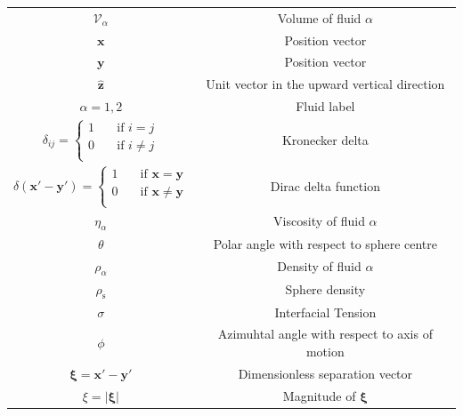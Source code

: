 \documentclass[12pt]{article}
\begin{document}
\begin{longtable}{|c|c|}
    $\mathcal{V}_{\alpha}$                                                          & Volume of fluid $\alpha$ \\
    $\boldsymbol{x}$                                                              & Position vector \\
    $\boldsymbol{y}$                                                              & Position vector \\
    $\boldsymbol{\hat{z}}$                                                        & Unit vector in the upward vertical direction \\
    $\alpha = 1,2$                                                                & Fluid label \\
    $\delta_{ij} = \begin{cases}
    1  & \quad \text{if } i = j\\
    0  & \quad \text{if } i \neq j\\
  \end{cases}$                                                                    & Kronecker delta \\
    $\delta(\boldsymbol{x'} - \boldsymbol{y'}) = \begin{cases}
    1  & \quad \text{if } \boldsymbol{x} = \boldsymbol{y}\\
    0  & \quad \text{if } \boldsymbol{x} \neq \boldsymbol{y}\\
  \end{cases}$                                                                    & Dirac delta function \\
    $\eta_{\alpha}$                                                                 & Viscosity of fluid $\alpha$ \\ 
    $\theta$                                                                      & Polar angle with respect to sphere centre \\
    $\rho_{\alpha}$                                                                 & Density of fluid $\alpha$   \\
    $\rho_{\text{s}}$                                                                & Sphere density          \\
    $\sigma$                                                                      & Interfacial Tension     \\
    $\phi$                                                                        & Azimuhtal angle with respect to axis of motion \\
    $\boldsymbol{\xi} = \boldsymbol{x'} - \boldsymbol{y'}$                        & Dimensionless separation vector \\                                   
    $\xi = |\boldsymbol{\xi}|$                                                    & Magnitude of $\boldsymbol{\xi}$ \\
    \hline %
  \end{longtable}
\end{document}
